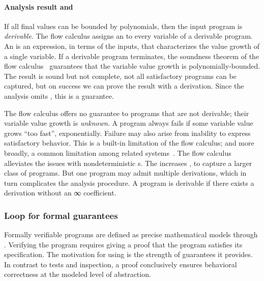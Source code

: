 \paragraph*{Analysis result and }
If all final values can be bounded by polynomials, then the input program is
\emph{derivable}. The flow calculus assigns an
\emph{} to every variable of a derivable program. An
 is an expression, in terms of the inputs, that characterizes the
value growth of a single variable. If a derivable program terminates, the
soundness theorem of the flow calculus~\cite[p. 11]{jones2009} guarantees that the variable value growth
is polynomially-bounded. The result is sound but not complete, \ie not all
satisfactory programs can be captured, but on success we can prove the result
with a derivation. Since the analysis omits , this is a
 guarantee.

The flow calculus offers no guarantee to programs that are
not derivable; their variable value growth is
\emph{unknown}. A program always fails if some variable value grows \enquote{too
fast}, \eg exponentially. Failure may also arise from inability to express
satisfactory behavior. This is a built-in limitation of the flow
calculus; and more broadly, a common limitation among
related systems~\cite[p. 2]{baillot2015}. The flow calculus alleviates the
issues with nondeterministic s. The
 increases , to capture a larger class
of programs. But one program may admit multiple derivations, which in turn
complicates the analysis procedure. A program is derivable
if there exists a derivation without an ∞ coefficient.

\subsubsection{Loop  for formal guarantees}
\label{subsec:specs}

Formally verifiable programs are defined as precise
mathematical models through . Verifying the program requires
giving a proof that the program satisfies its specification. The motivation for
using  is the strength of guarantees it provides. In
contrast to tests and inspection, a proof conclusively ensures behavioral
correctness at the modeled level of abstraction.

